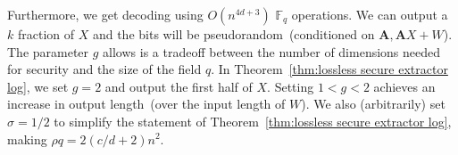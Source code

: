 \documentclass[11pt]{article}
\newcommand{\thref}[1]{\mbox{Theorem~\ref{#1}}}
\newcommand{\vect}[1]{\ensuremath{\textbf{#1}}}
\newcommand{\Fq}{\ensuremath{\mathbb{F}_q}}
\newcommand{\vA}{\vect{A}}
\begin{document}
Furthermore, we get decoding using $O(n^{4d+3})$ $\Fq$ operations.  We can output a $k$ fraction of $X$ and the bits will be pseudorandom~(conditioned on $\vA, \vA X+W$).  The parameter $g$ allows is a tradeoff between the number of dimensions needed for security and the size of the field $q$.  In \thref{thm:lossless secure extractor log}, we set $g=2$ and output the first half of $X$.  Setting $1<g<2$ achieves an increase in output length~(over the input length of $W$).   We also (arbitrarily) set $\sigma=1/2$ to simplify the statement of \thref{thm:lossless secure extractor log}, making $\rho q = 2(c/d+2) n^2$.

\end{document}
